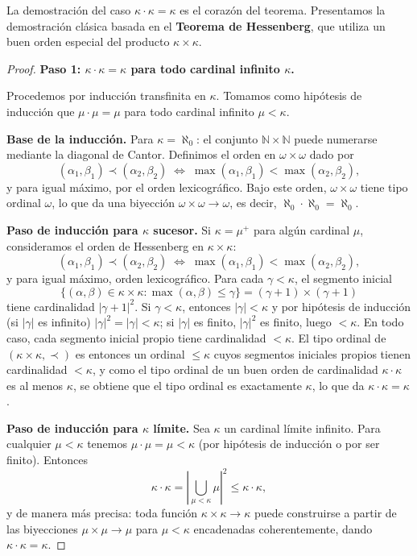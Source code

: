 La demostración del caso $\kappa \cdot \kappa = \kappa$ es el corazón del teorema. Presentamos la demostración clásica basada en el \textbf{Teorema de Hessenberg}, que utiliza un buen orden especial del producto $\kappa \times \kappa$.

\begin{proof}
\textbf{Paso 1: $\kappa \cdot \kappa = \kappa$ para todo cardinal infinito $\kappa$.}

Procedemos por inducción transfinita en $\kappa$. Tomamos como hipótesis de inducción que $\mu \cdot \mu = \mu$ para todo cardinal infinito $\mu < \kappa$.

\textbf{Base de la inducción.} Para $\kappa = \aleph_0$: el conjunto $\mathbb{N} \times \mathbb{N}$ puede numerarse mediante la diagonal de Cantor. Definimos el orden en $\omega \times \omega$ dado por
\[
  (\alpha_1, \beta_1) \prec (\alpha_2, \beta_2)
  \;\iff\;
  \max(\alpha_1,\beta_1) < \max(\alpha_2,\beta_2),
\]
y para igual máximo, por el orden lexicográfico. Bajo este orden, $\omega \times \omega$ tiene tipo ordinal $\omega$, lo que da una biyección $\omega \times \omega \to \omega$, es decir, $\aleph_0 \cdot \aleph_0 = \aleph_0$.

\textbf{Paso de inducción para $\kappa$ sucesor.} Si $\kappa = \mu^+$ para algún cardinal $\mu$, consideramos el orden de Hessenberg en $\kappa \times \kappa$:
\[
  (\alpha_1, \beta_1) \prec (\alpha_2, \beta_2)
  \;\iff\;
  \max(\alpha_1, \beta_1) < \max(\alpha_2, \beta_2),
\]
y para igual máximo, orden lexicográfico. Para cada $\gamma < \kappa$, el segmento inicial
\[
  \{(\alpha, \beta) \in \kappa \times \kappa : \max(\alpha,\beta) \leq \gamma\}
  = (\gamma+1) \times (\gamma+1)
\]
tiene cardinalidad $|\gamma+1|^2$. Si $\gamma < \kappa$, entonces $|\gamma| < \kappa$ y por hipótesis de inducción (si $|\gamma|$ es infinito) $|\gamma|^2 = |\gamma| < \kappa$; si $|\gamma|$ es finito, $|\gamma|^2$ es finito, luego $< \kappa$. En todo caso, cada segmento inicial propio tiene cardinalidad $< \kappa$. El tipo ordinal de $(\kappa \times \kappa, \prec)$ es entonces un ordinal $\leq \kappa$ cuyos segmentos iniciales propios tienen cardinalidad $< \kappa$, y como el tipo ordinal de un buen orden de cardinalidad $\kappa \cdot \kappa$ es al menos $\kappa$, se obtiene que el tipo ordinal es exactamente $\kappa$, lo que da $\kappa \cdot \kappa = \kappa$.

\textbf{Paso de inducción para $\kappa$ límite.} Sea $\kappa$ un cardinal límite infinito. Para cualquier $\mu < \kappa$ tenemos $\mu \cdot \mu = \mu < \kappa$ (por hipótesis de inducción o por ser finito). Entonces
\[
  \kappa \cdot \kappa = \left|\bigcup_{\mu < \kappa} \mu\right|^2 \leq \kappa \cdot \kappa,
\]
y de manera más precisa: toda función $\kappa \times \kappa \to \kappa$ puede construirse a partir de las biyecciones $\mu \times \mu \to \mu$ para $\mu < \kappa$ encadenadas coherentemente, dando $\kappa \cdot \kappa = \kappa$.


\end{proof}
